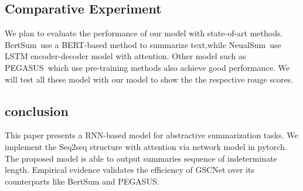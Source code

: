 \documentclass[conference]{IEEEtran}
\begin{document}
\subsection{Comparative Experiment}
We plan to evaluate the performance of our model with state-of-art methods. BertSum~\cite{liu2019text}use a BERT-based method to summarize text,while NeualSum~\cite{cheng2016neural}use LSTM encoder-decoder model with attention. Other model such as PEGASUS~\cite{zhang1912pegasus}which use pre-training methods also achieve good performance. We will test all these model with our model to show the 
the respective rouge scores.
\subsection{conclusion}
This paper presents a RNN-based model for abstractive summarization tasks. We implement the Seq2seq structure with attention via network model in pytorch. The proposed model is able to output summaries sequence of indeterminate length. Empirical evidence validates the efficiency of
GSCNet over its counterparts like BertSum and PEGASUS.   



\end{document}
